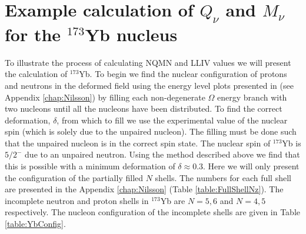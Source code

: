 \documentclass[10pt,a4paper, twoside, openright]{report}
\begin{document}
\section{Example calculation of $Q_{\nu}$ and $M_{\nu}$ for the $^{173}$Yb nucleus}
To illustrate the process of calculating NQMN and LLIV values we will present the calculation of $^{173}$Yb. To begin we find the nuclear configuration of protons and neutrons in the deformed field using the energy level plots presented in \cite{Nilsson1955,BohrMottVol2} (see Appendix \ref{chap:Nilsson}) by filling each non-degenerate $\Omega$ energy branch with two nucleons until all the nucleons have been distributed. To find the correct deformation, $\delta$, from which to fill we use the experimental value of the nuclear spin (which is solely due to the unpaired nucleon). The filling must be done such that the unpaired nucleon is in the correct spin state. The nuclear spin of $^{173}$Yb is $5/2^{-}$ due to an unpaired neutron. Using the method described above we find that this is possible with a minimum deformation of $\delta \approx 0.3$. Here we will only present the configuration of the partially filled $N$ shells. The numbers for each full shell are presented in the Appendix \ref{chap:Nilsson} (Table \ref{table:FullShellNz}). The incomplete neutron and proton shells in $^{173}$Yb are $N = 5,6$ and $N = 4,5$ respectively. The nucleon configuration of the incomplete shells are given in Table \ref{table:YbConfig}.
\end{document}
